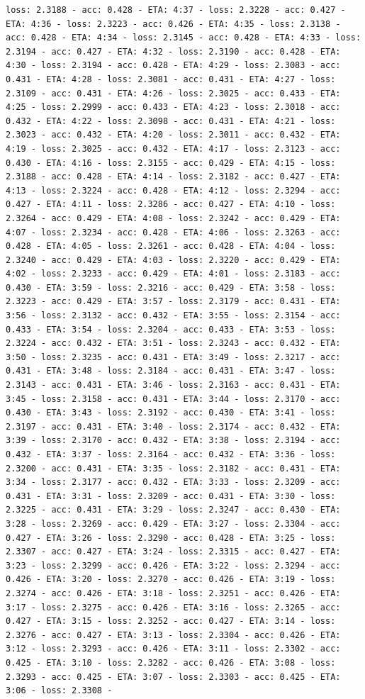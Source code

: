 \documentclass[11pt]{article}
\begin{document}
\begin{Verbatim}[commandchars=\\\{\}]
loss: 2.3188 - acc: 0.428 - ETA: 4:37 - loss: 2.3228 - acc: 0.427 - ETA: 4:36 - loss: 2.3223 - acc: 0.426 - ETA: 4:35 - loss: 2.3138 - acc: 0.428 - ETA: 4:34 - loss: 2.3145 - acc: 0.428 - ETA: 4:33 - loss: 2.3194 - acc: 0.427 - ETA: 4:32 - loss: 2.3190 - acc: 0.428 - ETA: 4:30 - loss: 2.3194 - acc: 0.428 - ETA: 4:29 - loss: 2.3083 - acc: 0.431 - ETA: 4:28 - loss: 2.3081 - acc: 0.431 - ETA: 4:27 - loss: 2.3109 - acc: 0.431 - ETA: 4:26 - loss: 2.3025 - acc: 0.433 - ETA: 4:25 - loss: 2.2999 - acc: 0.433 - ETA: 4:23 - loss: 2.3018 - acc: 0.432 - ETA: 4:22 - loss: 2.3098 - acc: 0.431 - ETA: 4:21 - loss: 2.3023 - acc: 0.432 - ETA: 4:20 - loss: 2.3011 - acc: 0.432 - ETA: 4:19 - loss: 2.3025 - acc: 0.432 - ETA: 4:17 - loss: 2.3123 - acc: 0.430 - ETA: 4:16 - loss: 2.3155 - acc: 0.429 - ETA: 4:15 - loss: 2.3188 - acc: 0.428 - ETA: 4:14 - loss: 2.3182 - acc: 0.427 - ETA: 4:13 - loss: 2.3224 - acc: 0.428 - ETA: 4:12 - loss: 2.3294 - acc: 0.427 - ETA: 4:11 - loss: 2.3286 - acc: 0.427 - ETA: 4:10 - loss: 2.3264 - acc: 0.429 - ETA: 4:08 - loss: 2.3242 - acc: 0.429 - ETA: 4:07 - loss: 2.3234 - acc: 0.428 - ETA: 4:06 - loss: 2.3263 - acc: 0.428 - ETA: 4:05 - loss: 2.3261 - acc: 0.428 - ETA: 4:04 - loss: 2.3240 - acc: 0.429 - ETA: 4:03 - loss: 2.3220 - acc: 0.429 - ETA: 4:02 - loss: 2.3233 - acc: 0.429 - ETA: 4:01 - loss: 2.3183 - acc: 0.430 - ETA: 3:59 - loss: 2.3216 - acc: 0.429 - ETA: 3:58 - loss: 2.3223 - acc: 0.429 - ETA: 3:57 - loss: 2.3179 - acc: 0.431 - ETA: 3:56 - loss: 2.3132 - acc: 0.432 - ETA: 3:55 - loss: 2.3154 - acc: 0.433 - ETA: 3:54 - loss: 2.3204 - acc: 0.433 - ETA: 3:53 - loss: 2.3224 - acc: 0.432 - ETA: 3:51 - loss: 2.3243 - acc: 0.432 - ETA: 3:50 - loss: 2.3235 - acc: 0.431 - ETA: 3:49 - loss: 2.3217 - acc: 0.431 - ETA: 3:48 - loss: 2.3184 - acc: 0.431 - ETA: 3:47 - loss: 2.3143 - acc: 0.431 - ETA: 3:46 - loss: 2.3163 - acc: 0.431 - ETA: 3:45 - loss: 2.3158 - acc: 0.431 - ETA: 3:44 - loss: 2.3170 - acc: 0.430 - ETA: 3:43 - loss: 2.3192 - acc: 0.430 - ETA: 3:41 - loss: 2.3197 - acc: 0.431 - ETA: 3:40 - loss: 2.3174 - acc: 0.432 - ETA: 3:39 - loss: 2.3170 - acc: 0.432 - ETA: 3:38 - loss: 2.3194 - acc: 0.432 - ETA: 3:37 - loss: 2.3164 - acc: 0.432 - ETA: 3:36 - loss: 2.3200 - acc: 0.431 - ETA: 3:35 - loss: 2.3182 - acc: 0.431 - ETA: 3:34 - loss: 2.3177 - acc: 0.432 - ETA: 3:33 - loss: 2.3209 - acc: 0.431 - ETA: 3:31 - loss: 2.3209 - acc: 0.431 - ETA: 3:30 - loss: 2.3225 - acc: 0.431 - ETA: 3:29 - loss: 2.3247 - acc: 0.430 - ETA: 3:28 - loss: 2.3269 - acc: 0.429 - ETA: 3:27 - loss: 2.3304 - acc: 0.427 - ETA: 3:26 - loss: 2.3290 - acc: 0.428 - ETA: 3:25 - loss: 2.3307 - acc: 0.427 - ETA: 3:24 - loss: 2.3315 - acc: 0.427 - ETA: 3:23 - loss: 2.3299 - acc: 0.426 - ETA: 3:22 - loss: 2.3294 - acc: 0.426 - ETA: 3:20 - loss: 2.3270 - acc: 0.426 - ETA: 3:19 - loss: 2.3274 - acc: 0.426 - ETA: 3:18 - loss: 2.3251 - acc: 0.426 - ETA: 3:17 - loss: 2.3275 - acc: 0.426 - ETA: 3:16 - loss: 2.3265 - acc: 0.427 - ETA: 3:15 - loss: 2.3252 - acc: 0.427 - ETA: 3:14 - loss: 2.3276 - acc: 0.427 - ETA: 3:13 - loss: 2.3304 - acc: 0.426 - ETA: 3:12 - loss: 2.3293 - acc: 0.426 - ETA: 3:11 - loss: 2.3302 - acc: 0.425 - ETA: 3:10 - loss: 2.3282 - acc: 0.426 - ETA: 3:08 - loss: 2.3293 - acc: 0.425 - ETA: 3:07 - loss: 2.3303 - acc: 0.425 - ETA: 3:06 - loss: 2.3308 - 
\end{Verbatim}
\end{document}
